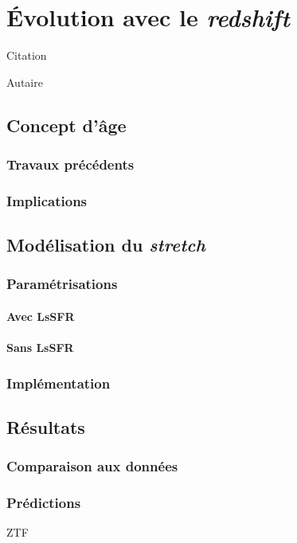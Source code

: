 \documentclass[../main/main.tex]{subfiles}
\begin{document}
\chapter{\'Evolution avec le \textit{redshift}}\label{ch:stretch}

\epigraph{Citation}{Autaire}

\minitoc
\newpage

\section{Concept d'\^age}\label{sec:age}

\subsection{Travaux précédents}\label{ssec:rates}

\subsection{Implications}\label{ssec:ageimpl}


\section{Modélisation du \textit{stretch}}\label{sec:xmod}

\subsection{Paramétrisations}\label{ssec:pmod}
\subsubsection*{Avec LsSFR}\label{sssec:lssfr}
\subsubsection*{Sans LsSFR}\label{sssec:z}

\subsection{Implémentation}\label{ssec:modimpl}


\section{Résultats}\label{sec:xres}

\subsection{Comparaison aux données}\label{ssec:xcomp}

\subsection{Prédictions}\label{ssec:xpred}
ZTF
\end{document}

